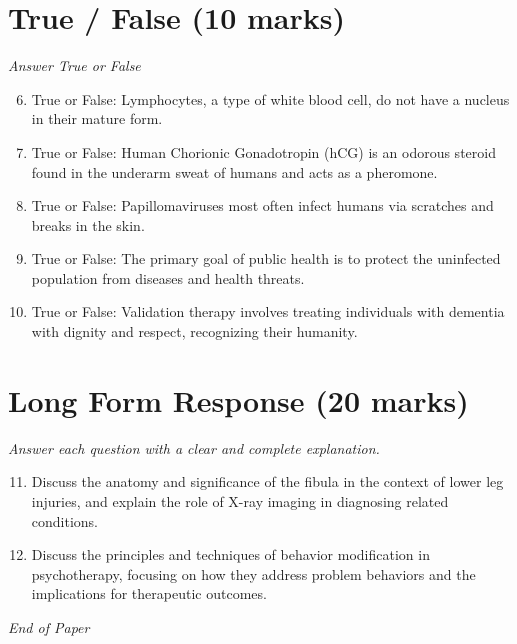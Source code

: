 \documentclass[12pt]{article}
\begin{document}
\section*{True / False (10 marks)}
\textit{Answer True or False}
\begin{enumerate}[label=\arabic*.]
\setcounter{enumi}{5}
\item True or False: Lymphocytes, a type of white blood cell, do not have a nucleus in their mature form.
\item True or False: Human Chorionic Gonadotropin (hCG) is an odorous steroid found in the underarm sweat of humans and acts as a pheromone.
\item True or False: Papillomaviruses most often infect humans via scratches and breaks in the skin.
\item True or False: The primary goal of public health is to protect the uninfected population from diseases and health threats.
\item True or False: Validation therapy involves treating individuals with dementia with dignity and respect, recognizing their humanity.
\end{enumerate}

\section*{Long Form Response (20 marks)}
\textit{Answer each question with a clear and complete explanation.}
\begin{enumerate}[label=\arabic*.]
\setcounter{enumi}{10}
\item Discuss the anatomy and significance of the fibula in the context of lower leg injuries, and explain the role of X-ray imaging in diagnosing related conditions.
\item Discuss the principles and techniques of behavior modification in psychotherapy, focusing on how they address problem behaviors and the implications for therapeutic outcomes.
\end{enumerate}

\vfill
\noindent\textit{End of Paper}
\end{document}
